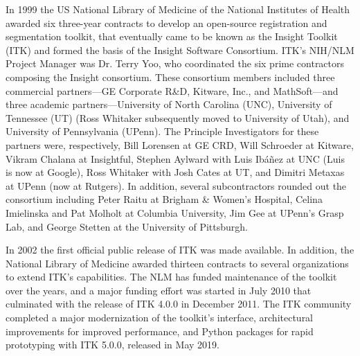 In 1999 the US National Library of Medicine of the National Institutes of
Health awarded six three-year contracts to develop an open-source
registration and segmentation toolkit, that eventually came to be known as
the Insight Toolkit (ITK) and formed the basis of the Insight Software
Consortium. ITK's NIH/NLM Project Manager was Dr. Terry Yoo, who coordinated the
six prime contractors composing the Insight consortium. These consortium
members included three commercial partners---GE Corporate R\&D, Kitware,
Inc., and MathSoft---and three academic
partners---University of North Carolina (UNC), University of Tennessee (UT)
(Ross Whitaker subsequently moved to University of Utah), and University of
Pennsylvania (UPenn). The Principle Investigators for these partners were,
respectively, Bill Lorensen at GE CRD, Will Schroeder at Kitware, Vikram
Chalana at Insightful, Stephen Aylward with Luis Ib\'{a}\~{n}ez at UNC (Luis
is now at Google), Ross Whitaker with Josh Cates at UT,
and Dimitri Metaxas at UPenn (now at Rutgers). In addition, several
subcontractors rounded out the consortium including Peter Raitu at Brigham \&
Women's Hospital, Celina Imielinska and Pat Molholt at Columbia University,
Jim Gee at UPenn's Grasp Lab, and George Stetten at the University of
Pittsburgh.

In 2002 the first official public release of ITK was made available. In
addition, the National Library of Medicine awarded thirteen contracts to
several organizations to extend ITK's capabilities. The NLM has funded
maintenance of the toolkit over the years, and a major funding effort was
started in July 2010 that culminated with the release of ITK 4.0.0 in December
2011. The ITK community completed a major modernization of the toolkit's
interface, architectural improvements for improved performance, and Python
packages for rapid prototyping with ITK 5.0.0, released in May 2019.
